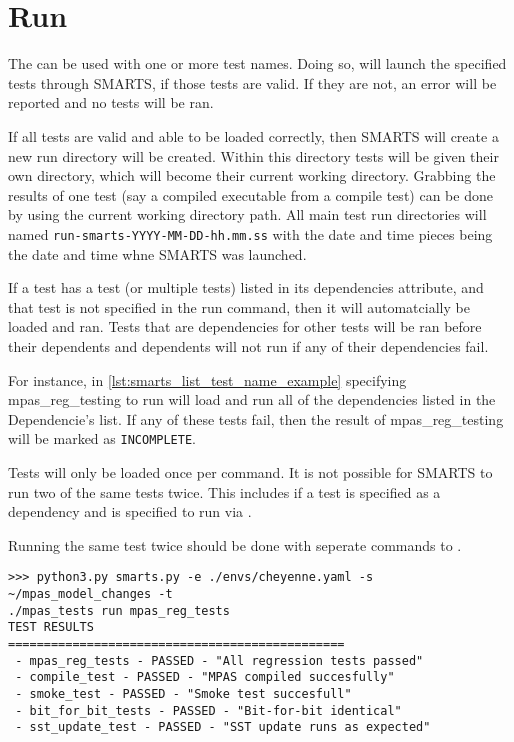 \section{Run}
\label{sec:run}

The \runcmd can be used with one or more test names. Doing so, will launch the
specified tests through SMARTS, if those tests are valid. If they are not, an
error will be reported and no tests will be ran.

If all tests are valid and able to be loaded correctly, then SMARTS will create
a new run directory will be created. Within this directory tests will be given
their own directory, which will become their current working directory.
Grabbing the results of one test (say a compiled executable from a compile
test) can be done by using the current working directory path. All main test run
directories will named {\tt run-smarts-YYYY-MM-DD-hh.mm.ss} with the date and
time pieces being the date and time whne SMARTS was launched. 

If a test has a test (or multiple tests) listed in its dependencies attribute,
and that test is not specified in the run command, then it will automatcially
be loaded and ran. Tests that are dependencies for other tests will be ran
before their dependents and dependents will not run if any of their
dependencies fail.

For instance, in \ref{lst:smarts_list_test_name_example} specifying
mpas\_reg\_testing to run will load and run all of the dependencies listed in
the Dependencie's list. If any of these tests fail, then the result of
mpas\_reg\_testing will be marked as {\tt INCOMPLETE}.

Tests will only be loaded once per \smartspy command. It is not possible for
SMARTS to run two of the same tests twice. This includes if a test is specified
as a dependency and is specified to run via \smartspy.

Running the same test twice should be done with seperate commands to \smartspy.

\begin{lstlisting}[language=Clean,
                   caption={smarts.py run tests example},
                   label=lst:smarts_run_test_example]
>>> python3.py smarts.py -e ./envs/cheyenne.yaml -s ~/mpas_model_changes -t
./mpas_tests run mpas_reg_tests
TEST RESULTS
===============================================
 - mpas_reg_tests - PASSED - "All regression tests passed"
 - compile_test - PASSED - "MPAS compiled succesfully"
 - smoke_test - PASSED - "Smoke test succesfull"
 - bit_for_bit_tests - PASSED - "Bit-for-bit identical"
 - sst_update_test - PASSED - "SST update runs as expected"
\end{lstlisting}
